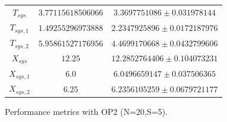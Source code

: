 \begin{figure}
\begin{center}
\begin{tabular}{|c||c|c|}
$T_{sys}$  & $3.77115618506066$ & $3.3697751086\pm 0.031978144$ \\ 
$T_{sys,1}$  & $1.49255296973888$ & $2.2347925896\pm 0.0172187976$ \\ 
$T_{sys,2}$  & $5.95861527176956$ & $4.4699170668\pm 0.0432799606$ \\ 
$X_{sys}$  & $12.25$ & $12.2852764406\pm 0.104073231$ \\ 
$X_{sys,1}$  & $6.0$ & $6.0496659147\pm 0.037506365$ \\ 
$X_{sys,2}$  & $6.25$ & $6.2356105259\pm 0.0679721177$ \\ 
\hline 
		\end{tabular}
	\end{center}
	\caption{Performance metrics with OP2 (N=20,S=5).}
	\label{tbl:evaluation-performance-metrics-2-5}
\end{figure}


%


